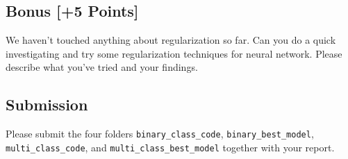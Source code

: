 \documentclass[letterpaper]{article}
\begin{document}
\subsection{Bonus [+5 Points]}
We haven't touched anything about regularization so far. Can you do a quick
investigating and try some regularization techniques for neural network. Please
describe what you've tried and your findings.

\subsection{Submission}
Please submit the four folders \verb|binary_class_code|,
\verb|binary_best_model|, \verb|multi_class_code|, and
\verb|multi_class_best_model| together with your report.
\end{document}
